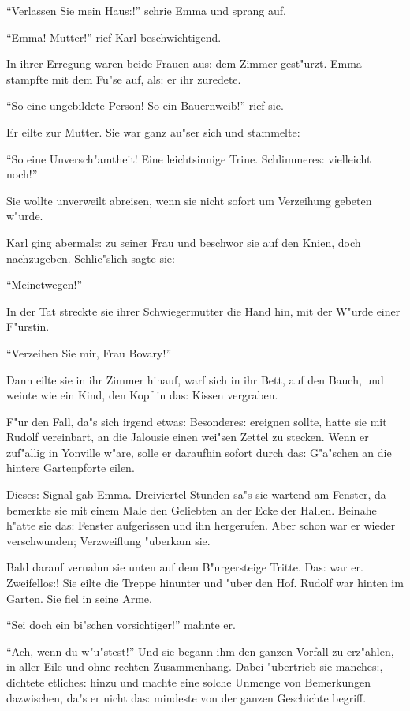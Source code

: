 \documentclass[oneside,12pt]{book}
\newcommand{\s}{s:}%
\begin{document}
"`Verlassen Sie mein Hau{\s}!"' schrie Emma und sprang auf.

"`Emma! Mutter!"' rief Karl beschwichtigend.

In ihrer Erregung waren beide Frauen au{\s} dem Zimmer gest"urzt.
Emma stampfte mit dem Fu"se auf, al{\s} er ihr zuredete.

"`So eine ungebildete Person! So ein Bauernweib!"' rief sie.

Er eilte zur Mutter. Sie war ganz au"ser sich und stammelte:

"`So eine Unversch"amtheit! Eine leichtsinnige Trine.
Schlimmere{\s} vielleicht noch!"'

Sie wollte unverweilt abreisen, wenn sie nicht sofort um
Verzeihung gebeten w"urde.

Karl ging abermal{\s} zu seiner Frau und beschwor sie auf den
Knien, doch nachzugeben. Schlie"slich sagte sie:

"`Meinetwegen!"'

In der Tat streckte sie ihrer Schwiegermutter die Hand hin, mit
der W"urde einer F"urstin.

"`Verzeihen Sie mir, Frau Bovary!"'

Dann eilte sie in ihr Zimmer hinauf, warf sich in ihr Bett, auf
den Bauch, und weinte wie ein Kind, den Kopf in da{\s} Kissen
vergraben.

F"ur den Fall, da"s sich irgend etwa{\s} Besondere{\s} ereignen
sollte, hatte sie mit Rudolf vereinbart, an die Jalousie einen
wei"sen Zettel zu stecken. Wenn er zuf"allig in Yonville w"are,
solle er daraufhin sofort durch da{\s} G"a"schen an die hintere
Gartenpforte eilen.

Diese{\s} Signal gab Emma. Dreiviertel Stunden sa"s sie wartend am
Fenster, da bemerkte sie mit einem Male den Geliebten an der Ecke
der Hallen. Beinahe h"atte sie da{\s} Fenster aufgerissen und ihn
hergerufen. Aber schon war er wieder verschwunden; Verzweiflung
"uberkam sie.

Bald darauf vernahm sie unten auf dem B"urgersteige Tritte. Da{\s}
war er. Zweifello{\s}! Sie eilte die Treppe hinunter und "uber den
Hof. Rudolf war hinten im Garten. Sie fiel in seine Arme.

"`Sei doch ein bi"schen vorsichtiger!"' mahnte er.

"`Ach, wenn du w"u"stest!"' Und sie begann ihm den ganzen Vorfall
zu erz"ahlen, in aller Eile und ohne rechten Zusammenhang. Dabei
"ubertrieb sie manche{\s}, dichtete etliche{\s} hinzu und machte
eine solche Unmenge von Bemerkungen dazwischen, da"s er nicht
da{\s} mindeste von der ganzen Geschichte begriff.
\end{document}
